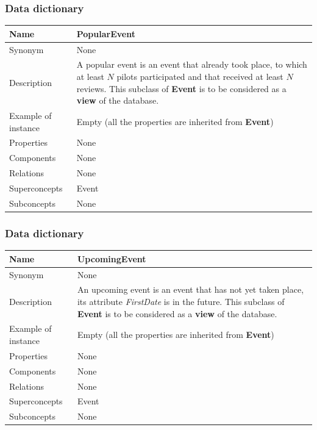 \documentclass{beamer}
\begin{document}
\begin{frame}
    \frametitle{Data dictionary}
    \begin{table}
    \tiny
    \begin{tabular}{|p{2cm}|p{6cm}|}
    \hline
    Name & \textbf{PopularEvent} \\
    \hline
    Synonym & None \\
    \hline
    Description & A popular event is an event that already took place, 
    to which at least $N$ pilots participated 
    and that received at least $N$ reviews. \newline
    This subclass of \textbf{Event} is to be considered as a \textbf{view} of the database. \\
    \hline
    Example of instance & Empty (all the properties are inherited from \textbf{Event}) \\
    \hline
    Properties & None \\
    \hline
    Components & None \\
    \hline
    Relations & None \\
    \hline
    Superconcepts & Event \\
    \hline
    Subconcepts & None \\
    \hline
    \end{tabular}
    \end{table}
\end{frame}


\begin{frame}
    \frametitle{Data dictionary}
    \begin{table}
    \tiny
    \begin{tabular}{|p{2cm}|p{6cm}|}
    \hline
    Name & \textbf{UpcomingEvent} \\
    \hline
    Synonym & None \\
    \hline
    Description & An upcoming event is an 
    event that has not yet taken place, its attribute \textit{FirstDate} is in the future. \newline
    This subclass of \textbf{Event} is to be considered 
    as a \textbf{view} of the database. \\
    \hline
    Example of instance & Empty (all the properties are inherited from \textbf{Event}) \\
    \hline
    Properties & None \\
    \hline
    Components & None \\
    \hline
    Relations & None \\
    \hline
    Superconcepts & Event \\
    \hline
    Subconcepts & None \\
    \hline
    \end{tabular}
    \end{table}
\end{frame}
\end{document}
